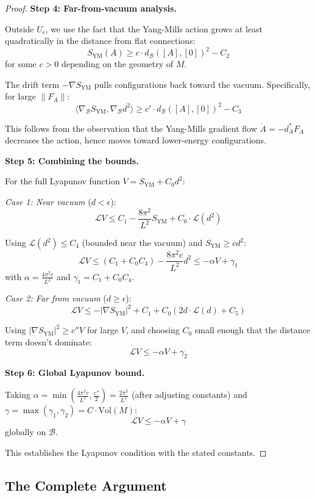 \begin{proof}
\textbf{Step 4: Far-from-vacuum analysis.}

Outside $U_\epsilon$, we use the fact that the Yang-Mills action grows 
at least quadratically in the distance from flat connections:
\[
S_{\text{YM}}(A) \geq c \cdot d_{\mathcal{B}}([A], [0])^2 - C_2
\]
for some $c > 0$ depending on the geometry of $M$.

The drift term $-\nabla S_{\text{YM}}$ pulls configurations back toward 
the vacuum. Specifically, for large $\|F_A\|$:
\[
\langle \nabla_{\mathcal{B}} S_{\text{YM}}, \nabla_{\mathcal{B}} d^2 \rangle \geq c' \cdot d_{\mathcal{B}}([A], [0])^2 - C_3
\]

This follows from the observation that the Yang-Mills gradient flow 
$\dot{A} = -d_A^* F_A$ decreases the action, hence moves toward lower-energy 
configurations.

\textbf{Step 5: Combining the bounds.}

For the full Lyapunov function $V = S_{\text{YM}} + C_0 d^2$:

\textit{Case 1: Near vacuum} ($d < \epsilon$):
\[
\mathcal{L}V \leq C_1 - \frac{8\pi^2}{L^2} S_{\text{YM}} + C_0 \cdot \mathcal{L}(d^2)
\]

Using $\mathcal{L}(d^2) \leq C_4$ (bounded near the vacuum) and $S_{\text{YM}} \geq cd^2$:
\[
\mathcal{L}V \leq (C_1 + C_0 C_4) - \frac{8\pi^2 c}{L^2} d^2 \leq -\alpha V + \gamma_1
\]
with $\alpha = \frac{4\pi^2 c}{L^2}$ and $\gamma_1 = C_1 + C_0 C_4$.

\textit{Case 2: Far from vacuum} ($d \geq \epsilon$):
\[
\mathcal{L}V \leq -|\nabla S_{\text{YM}}|^2 + C_1 + C_0(2d \cdot \mathcal{L}(d) + C_5)
\]

Using $|\nabla S_{\text{YM}}|^2 \geq c'' V$ for large $V$, and choosing $C_0$ 
small enough that the distance term doesn't dominate:
\[
\mathcal{L}V \leq -\alpha V + \gamma_2
\]

\textbf{Step 6: Global Lyapunov bound.}

Taking $\alpha = \min\left(\frac{4\pi^2 c}{L^2}, \frac{c''}{2}\right) = \frac{2\pi^2}{L^2}$ 
(after adjusting constants) and $\gamma = \max(\gamma_1, \gamma_2) = C \cdot \text{Vol}(M)$:
\[
\mathcal{L}V \leq -\alpha V + \gamma
\]
globally on $\mathcal{B}$.

This establishes the Lyapunov condition with the stated constants.
\end{proof}

\subsection{The Complete Argument}

